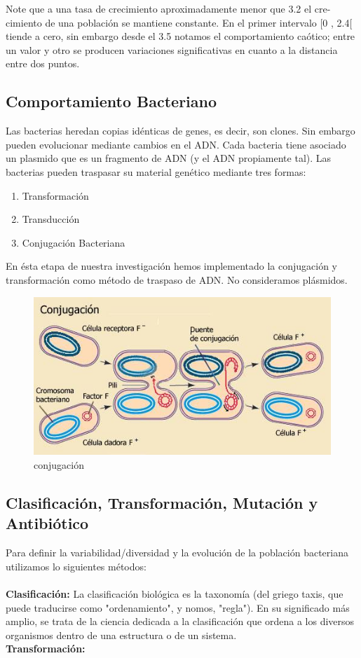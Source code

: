\documentclass[DIV=calc, paper=a4, fontsize=11pt, twocolumn]{scrartcl}	 %
\begin{document}
Note que a una tasa de crecimiento aproximadamente menor que 3.2 el cre-cimiento de una población se mantiene constante. En el primer intervalo [0 , 2.4[ tiende a cero, sin embargo desde el 3.5 notamos el comportamiento caótico; entre un valor y otro se producen variaciones significativas en cuanto a la distancia entre dos puntos.
\subsection*{Comportamiento Bacteriano}
Las bacterias heredan copias idénticas de genes, es decir, son clones. Sin embargo pueden evolucionar mediante cambios en el ADN. Cada bacteria tiene asociado un plasmido que es un fragmento de ADN (y el ADN propiamente tal).
Las bacterias pueden traspasar su material genético mediante tres formas:
\begin{enumerate}
\item Transformación
\item Transducción
\item Conjugación Bacteriana
\end{enumerate}
En ésta etapa de nuestra investigación hemos implementado la conjugación y transformación como método de traspaso de ADN. No consideramos plásmidos.
\begin{figure}[htp]
\centering
\includegraphics[scale=0.40]{1.png}
\caption{conjugación}
\label{con}
\end{figure}

\subsection*{Clasificación, Transformación, Mutación y Antibiótico}
Para definir la variabilidad/diversidad y la evolución de la población bacteriana utilizamos lo siguientes métodos:\\\\\textbf{Clasificación: }La clasificación biológica es la taxonomía (del griego taxis, que puede traducirse como "ordenamiento", y nomos, "regla"). En su significado más amplio, se trata de la ciencia dedicada a la clasificación que ordena a los diversos organismos dentro de una estructura o de un sistema.\\\textbf{Transformación:} 
\end{document}
